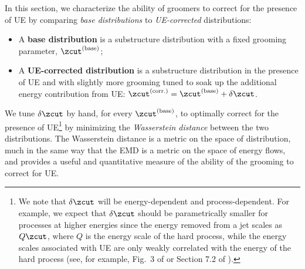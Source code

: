 \documentclass[letterpaper,11pt]{article}
\begin{document}
In this section, we characterize the ability of groomers to correct for the presence of UE by comparing \textit{base distributions} to \textit{UE-corrected} distributions:
\begin{itemize}
    \item
    A \textbf{base distribution} is a substructure distribution with a fixed grooming parameter, \(\zcut^{(\rm base)}\);

    \item
    A \textbf{UE-corrected distribution} is a substructure distribution in the presence of UE and with slightly more grooming tuned to soak up the additional energy contribution from UE:
    \(\zcut^{(\rm corr.)} = \zcut^{(\rm base)} + \delta\zcut\).
\end{itemize}
We tune \(\delta \zcut\) by hand, for every \(\zcut^{(\rm base)}\), to optimally correct for the presence of UE\footnote{
We note that \(\delta\zcut\) will be energy-dependent and process-dependent.
%
For example, we expect that \(\delta\zcut\) should be parametrically smaller for processes at higher energies since the energy removed from a jet scales as \(Q \zcut\), where \(Q\) is the energy scale of the hard process, while the energy scales associated with UE are only weakly correlated with the energy of the hard process (see, for example, Fig.~3 of  or Section 7.2 of ).
} by minimizing the \textit{Wasserstein distance} between the two distributions.
%
The Wasserstein distance is a metric on the space of distribution, much in the same way that the EMD is a metric on the space of energy flows, and provides a useful and quantitative measure of the ability of the grooming to correct for UE.
\end{document}

